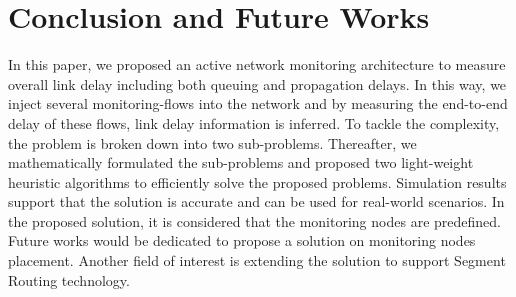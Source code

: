 \documentclass[10pt, journal, letterpaper]{IEEEtran}
\begin{document}
\section{Conclusion and Future Works}
In this paper, we proposed an active network monitoring architecture to measure overall link delay including both queuing and propagation delays. In this way, we inject several monitoring-flows into the network and by measuring the end-to-end delay of these flows, link delay information is inferred. To tackle the complexity, the problem is broken down into two sub-problems. Thereafter, we mathematically formulated the sub-problems and proposed two light-weight heuristic algorithms to efficiently solve the proposed problems. Simulation results support that the solution is accurate and can be used for real-world scenarios. In the proposed solution, it is considered that the monitoring nodes are predefined. Future works would be dedicated to propose a solution on monitoring nodes placement. Another field of interest is extending the solution to support Segment Routing technology. 





\end{document}
